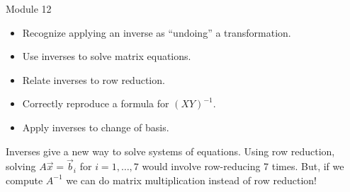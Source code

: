 \documentclass{workbook}
\begin{document}
\begin{lesson}

	Module 12

	\begin{itemize}
		\item Recognize applying an inverse as ``undoing'' a transformation.
		\item Use inverses to solve matrix equations.
		\item Relate inverses to row reduction.
		\item Correctly reproduce a formula for $(XY)^{-1}$.
		\item Apply inverses to change of basis.
	\end{itemize}

	Inverses give a new way to solve systems of equations. Using row reduction, solving $A\vec x=\vec b_i$ for $i=1,\ldots, 7$
	would involve row-reducing 7 times. But, if we compute $A^{-1}$ we can do matrix multiplication instead of row reduction!


\end{lesson}
\end{document}
